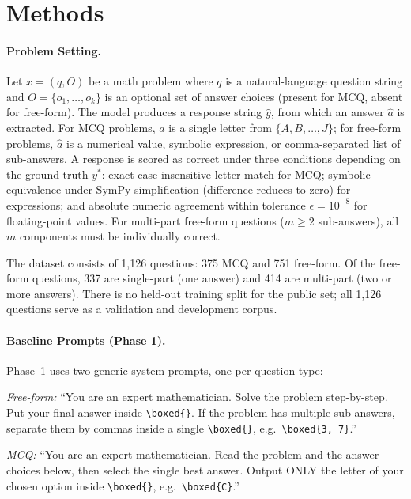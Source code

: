 \documentclass{article}
\begin{document}
\section{Methods}
\label{sec:methods}

\paragraph{Problem Setting.}
Let $x = (q, O)$ be a math problem where $q$ is a natural-language question string and $O = \{o_1, \ldots, o_k\}$ is an optional set of answer choices (present for MCQ, absent for free-form). The model produces a response string $\hat{y}$, from which an answer $\hat{a}$ is extracted. For MCQ problems, $\hat{a}$ is a single letter from $\{A, B, \ldots, J\}$; for free-form problems, $\hat{a}$ is a numerical value, symbolic expression, or comma-separated list of sub-answers. A response is scored as correct under three conditions depending on the ground truth $y^*$: exact case-insensitive letter match for MCQ; symbolic equivalence under SymPy simplification (difference reduces to zero) for expressions; and absolute numeric agreement within tolerance $\epsilon = 10^{-8}$ for floating-point values. For multi-part free-form questions ($m \geq 2$ sub-answers), all $m$ components must be individually correct.

The dataset consists of 1,126 questions: 375 MCQ and 751 free-form. Of the free-form questions, 337 are single-part (one answer) and 414 are multi-part (two or more answers). There is no held-out training split for the public set; all 1,126 questions serve as a validation and development corpus.

\paragraph{Baseline Prompts (Phase 1).}
Phase~1 uses two generic system prompts, one per question type:

\vspace{0.5em}
\noindent\textit{Free-form:} ``You are an expert mathematician. Solve the problem step-by-step. Put your final answer inside \texttt{\textbackslash boxed\{\}}. If the problem has multiple sub-answers, separate them by commas inside a single \texttt{\textbackslash boxed\{\}}, e.g.\ \texttt{\textbackslash boxed\{3, 7\}}.''

\vspace{0.5em}
\noindent\textit{MCQ:} ``You are an expert mathematician. Read the problem and the answer choices below, then select the single best answer. Output ONLY the letter of your chosen option inside \texttt{\textbackslash boxed\{\}}, e.g.\ \texttt{\textbackslash boxed\{C\}}.''
\end{document}
